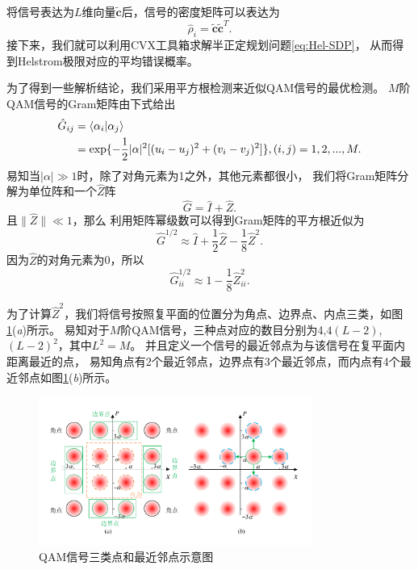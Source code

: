 将信号表达为$L$维向量$\tilde{\bm{c}}$后，信号的密度矩阵可以表达为
\begin{equation}
\hat{\rho}_i = \tilde{\bm{c}} \tilde{\bm{c}}^T.
\end{equation}
接下来，我们就可以利用CVX工具箱\cite{cvx,gb08}求解半正定规划问题\ref{eq:Hel-SDP}，
从而得到Helstrom极限对应的平均错误概率。

为了得到一些解析结论，我们采用平方根检测来近似QAM信号的最优检测。
$M$阶QAM信号的Gram矩阵由下式给出
\begin{equation}
\begin{split}
\hat{G}_{ij} &= \bra{\alpha_i}\ket{\alpha_j} \\
 &= \exp\{-\frac{1}{2} |\alpha|^2 [(u_i-u_j)^2 + (v_i-v_j)^2]\}, (i,j)=1,2,...,M.
\end{split}
\end{equation}
易知当$|\alpha|\gg1$时，除了对角元素为1之外，其他元素都很小，
我们将Gram矩阵分解为单位阵和一个$\hat{Z}$阵
\begin{equation}
\hat{G} = \hat{I} + \hat{Z}.
\end{equation}
且$\parallel \hat{Z}  \parallel \ll 1$，那么
利用矩阵幂级数可以得到Gram矩阵的平方根近似为
\begin{equation}
\hat{G}^{1/2} \approx \hat{I} + \frac{1}{2} \hat{Z} - \frac{1}{8} \hat{Z}^2.
\end{equation}
因为$\hat{Z}$的对角元素为0，所以
\begin{equation}
\hat{G}^{1/2}_{ii} \approx 1 - \frac{1}{8} \hat{Z}^2_{ii}.
\end{equation}

为了计算$\hat{Z}^2$，我们将信号按照复平面的位置分为角点、边界点、内点三类，如图\ref{fig:QAM-nearbor}(\textit{a})所示。
易知对于$M$阶QAM信号，三种点对应的数目分别为4,$4(L-2)$,$(L-2)^2$，其中$L^2=M$。
并且定义一个信号的最近邻点为与该信号在复平面内距离最近的点，
易知角点有2个最近邻点，边界点有3个最近邻点，而内点有4个最近邻点如图\ref{fig:QAM-nearbor}(\textit{b})所示。


\begin{figure}
\centering
  \includegraphics[width=0.8\textwidth]{figures/chap3/QAM-nearbor}
  \caption{QAM信号三类点和最近邻点示意图}
  \label{fig:QAM-nearbor}
\end{figure}

